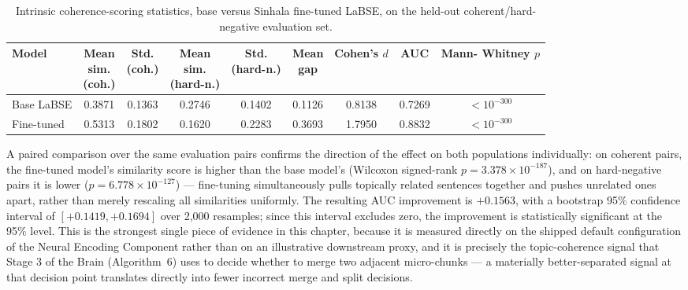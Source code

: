 \documentclass[12pt,a4paper,oneside]{report}
\begin{document}
\begin{table}[h]
\centering
\caption{Intrinsic coherence-scoring statistics, base versus Sinhala fine-tuned LaBSE, on the held-out coherent/hard-negative evaluation set.}
\label{tab:eval-labse-stats}
\renewcommand{\arraystretch}{1.3}
\scriptsize
\begin{tabularx}{\textwidth}{X c c c c c c c c}
\hline
\textbf{Model} & \makecell{\textbf{Mean}\\\textbf{sim.}\\\textbf{(coh.)}} & \makecell{\textbf{Std.}\\\textbf{(coh.)}} & \makecell{\textbf{Mean}\\\textbf{sim.}\\\textbf{(hard-n.)}} & \makecell{\textbf{Std.}\\\textbf{(hard-n.)}} & \makecell{\textbf{Mean}\\\textbf{gap}} & \makecell{\textbf{Cohen's}\\\textbf{$d$}} & \textbf{AUC} & \makecell{\textbf{Mann-}\\\textbf{Whitney}\\\textbf{$p$}} \\
\hline
Base LaBSE & 0.3871 & 0.1363 & 0.2746 & 0.1402 & 0.1126 & 0.8138 & 0.7269 & $<\!10^{-300}$ \\
\hline
Fine-tuned & 0.5313 & 0.1802 & 0.1620 & 0.2283 & 0.3693 & 1.7950 & 0.8832 & $<\!10^{-300}$ \\
\hline
\end{tabularx}
\end{table}

A paired comparison over the same evaluation pairs confirms the direction of the effect on both populations individually: on coherent pairs, the fine-tuned model's similarity score is higher than the base model's (Wilcoxon signed-rank $p = 3.378\times10^{-187}$), and on hard-negative pairs it is lower ($p = 6.778\times10^{-127}$) --- fine-tuning simultaneously pulls topically related sentences together and pushes unrelated ones apart, rather than merely rescaling all similarities uniformly. The resulting AUC improvement is $+0.1563$, with a bootstrap 95\% confidence interval of $[+0.1419, +0.1694]$ over 2{,}000 resamples; since this interval excludes zero, the improvement is statistically significant at the 95\% level. This is the strongest single piece of evidence in this chapter, because it is measured directly on the shipped default configuration of the Neural Encoding Component rather than on an illustrative downstream proxy, and it is precisely the topic-coherence signal that Stage 3 of the Brain (Algorithm~6) uses to decide whether to merge two adjacent micro-chunks — a materially better-separated signal at that decision point translates directly into fewer incorrect merge and split decisions.
\end{document}
